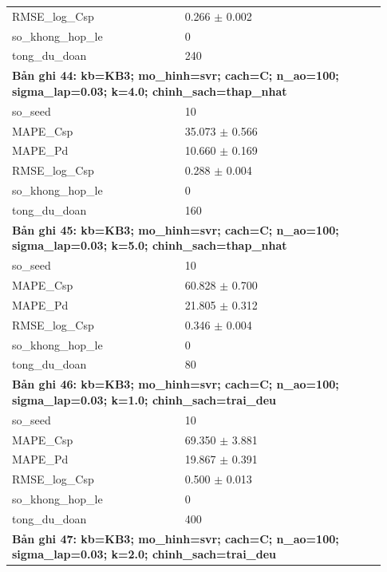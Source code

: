 \begin{longtable}{p{0.43\linewidth}p{0.50\linewidth}}
RMSE\_\allowbreak log\_\allowbreak Csp & 0.266 $\pm$ 0.002 \\
so\_\allowbreak khong\_\allowbreak hop\_\allowbreak le & 0 \\
tong\_\allowbreak du\_\allowbreak doan & 240 \\
\midrule
\multicolumn{2}{p{0.95\linewidth}}{\textbf{Bản ghi 44: kb=KB3; mo\_hinh=svr; cach=C; n\_ao=100; sigma\_lap=0.03; k=4.0; chinh\_sach=thap\_nhat}} \\
so\_\allowbreak seed & 10 \\
MAPE\_\allowbreak Csp & 35.073 $\pm$ 0.566 \\
MAPE\_\allowbreak Pd & 10.660 $\pm$ 0.169 \\
RMSE\_\allowbreak log\_\allowbreak Csp & 0.288 $\pm$ 0.004 \\
so\_\allowbreak khong\_\allowbreak hop\_\allowbreak le & 0 \\
tong\_\allowbreak du\_\allowbreak doan & 160 \\
\midrule
\multicolumn{2}{p{0.95\linewidth}}{\textbf{Bản ghi 45: kb=KB3; mo\_hinh=svr; cach=C; n\_ao=100; sigma\_lap=0.03; k=5.0; chinh\_sach=thap\_nhat}} \\
so\_\allowbreak seed & 10 \\
MAPE\_\allowbreak Csp & 60.828 $\pm$ 0.700 \\
MAPE\_\allowbreak Pd & 21.805 $\pm$ 0.312 \\
RMSE\_\allowbreak log\_\allowbreak Csp & 0.346 $\pm$ 0.004 \\
so\_\allowbreak khong\_\allowbreak hop\_\allowbreak le & 0 \\
tong\_\allowbreak du\_\allowbreak doan & 80 \\
\midrule
\multicolumn{2}{p{0.95\linewidth}}{\textbf{Bản ghi 46: kb=KB3; mo\_hinh=svr; cach=C; n\_ao=100; sigma\_lap=0.03; k=1.0; chinh\_sach=trai\_deu}} \\
so\_\allowbreak seed & 10 \\
MAPE\_\allowbreak Csp & 69.350 $\pm$ 3.881 \\
MAPE\_\allowbreak Pd & 19.867 $\pm$ 0.391 \\
RMSE\_\allowbreak log\_\allowbreak Csp & 0.500 $\pm$ 0.013 \\
so\_\allowbreak khong\_\allowbreak hop\_\allowbreak le & 0 \\
tong\_\allowbreak du\_\allowbreak doan & 400 \\
\midrule
\multicolumn{2}{p{0.95\linewidth}}{\textbf{Bản ghi 47: kb=KB3; mo\_hinh=svr; cach=C; n\_ao=100; sigma\_lap=0.03; k=2.0; chinh\_sach=trai\_deu}} \\

\end{longtable}
